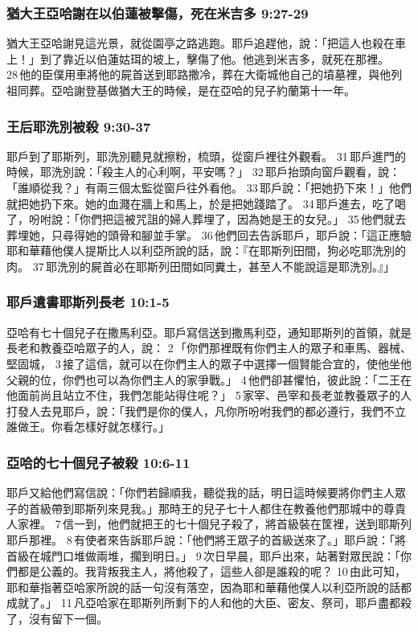 \subsubsection{猶大王亞哈謝在以伯蓮被擊傷，死在米吉多 9:27-29 }
猶大王亞哈謝見這光景，就從園亭之路逃跑。耶戶追趕他，說：「把這人也殺在車上！」到了靠近以伯蓮姑珥的坡上，擊傷了他。他逃到米吉多，就死在那裡。 28 他的臣僕用車將他的屍首送到耶路撒冷，葬在大衛城他自己的墳墓裡，與他列祖同葬。亞哈謝登基做猶大王的時候，是在亞哈的兒子約蘭第十一年。

\subsubsection{王后耶洗別被殺 9:30-37 }
耶戶到了耶斯列，耶洗別聽見就擦粉，梳頭，從窗戶裡往外觀看。 31 耶戶進門的時候，耶洗別說：「殺主人的心利啊，平安嗎？」 32 耶戶抬頭向窗戶觀看，說：「誰順從我？」有兩三個太監從窗戶往外看他。 33 耶戶說：「把她扔下來！」他們就把她扔下來。她的血濺在牆上和馬上，於是把她踐踏了。 34 耶戶進去，吃了喝了，吩咐說：「你們把這被咒詛的婦人葬埋了，因為她是王的女兒。」 35 他們就去葬埋她，只尋得她的頭骨和腳並手掌。 36 他們回去告訴耶戶，耶戶說：「這正應驗耶和華藉他僕人提斯比人以利亞所說的話，說：『在耶斯列田間，狗必吃耶洗別的肉。 37 耶洗別的屍首必在耶斯列田間如同糞土，甚至人不能說這是耶洗別。』」

\subsubsection{耶戶遺書耶斯列長老 10:1-5}
亞哈有七十個兒子在撒馬利亞。耶戶寫信送到撒馬利亞，通知耶斯列的首領，就是長老和教養亞哈眾子的人，說： 2 「你們那裡既有你們主人的眾子和車馬、器械、堅固城， 3 接了這信，就可以在你們主人的眾子中選擇一個賢能合宜的，使他坐他父親的位，你們也可以為你們主人的家爭戰。」 4 他們卻甚懼怕，彼此說：「二王在他面前尚且站立不住，我們怎能站得住呢？」 5 家宰、邑宰和長老並教養眾子的人打發人去見耶戶，說：「我們是你的僕人，凡你所吩咐我們的都必遵行，我們不立誰做王。你看怎樣好就怎樣行。」

\subsubsection{亞哈的七十個兒子被殺 10:6-11}
耶戶又給他們寫信說：「你們若歸順我，聽從我的話，明日這時候要將你們主人眾子的首級帶到耶斯列來見我。」那時王的兒子七十人都住在教養他們那城中的尊貴人家裡。 7 信一到，他們就把王的七十個兒子殺了，將首級裝在筐裡，送到耶斯列耶戶那裡。 8 有使者來告訴耶戶說：「他們將王眾子的首級送來了。」耶戶說：「將首級在城門口堆做兩堆，擱到明日。」 9 次日早晨，耶戶出來，站著對眾民說：「你們都是公義的。我背叛我主人，將他殺了，這些人卻是誰殺的呢？ 10 由此可知，耶和華指著亞哈家所說的話一句沒有落空，因為耶和華藉他僕人以利亞所說的話都成就了。」 11 凡亞哈家在耶斯列所剩下的人和他的大臣、密友、祭司，耶戶盡都殺了，沒有留下一個。


